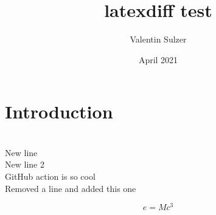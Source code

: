 \documentclass{article}
\title{latexdiff test}
\author{Valentin Sulzer}
\date{April 2021}
\begin{document}
\maketitle

\section{Introduction}

\\New line
\\New line 2
\\GitHub action is so cool
\\Removed a line and added this one

\begin{equation}
    e = Mc^3
\end{equation}
\end{document}
